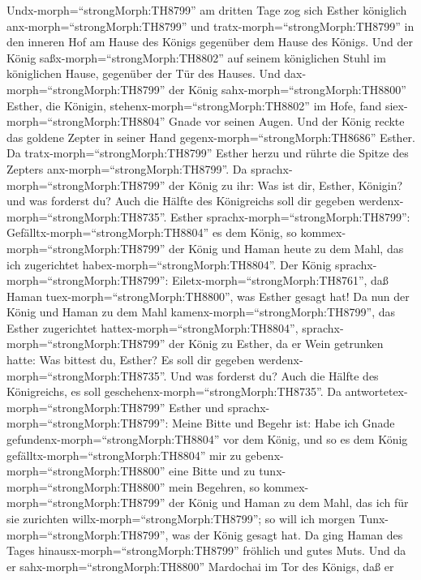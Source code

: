  Undx-morph=``strongMorph:TH8799'' am dritten Tage zog sich
Esther königlich anx-morph=``strongMorph:TH8799'' und
tratx-morph=``strongMorph:TH8799'' in den inneren Hof am Hause des
Königs gegenüber dem Hause des Königs. Und der König
saßx-morph=``strongMorph:TH8802'' auf seinem königlichen Stuhl im
königlichen Hause, gegenüber der Tür des Hauses.  Und
dax-morph=``strongMorph:TH8799'' der König
sahx-morph=``strongMorph:TH8800'' Esther, die Königin,
stehenx-morph=``strongMorph:TH8802'' im Hofe, fand
siex-morph=``strongMorph:TH8804'' Gnade vor seinen Augen. Und der König
reckte das goldene Zepter in seiner Hand
gegenx-morph=``strongMorph:TH8686'' Esther. Da
tratx-morph=``strongMorph:TH8799'' Esther herzu und rührte die Spitze
des Zepters anx-morph=``strongMorph:TH8799''.  Da
sprachx-morph=``strongMorph:TH8799'' der König zu ihr: Was ist dir,
Esther, Königin? und was forderst du? Auch die Hälfte des Königreichs
soll dir gegeben werdenx-morph=``strongMorph:TH8735''. 
Esther sprachx-morph=``strongMorph:TH8799'':
Gefälltx-morph=``strongMorph:TH8804'' es dem König, so
kommex-morph=``strongMorph:TH8799'' der König und Haman heute zu dem
Mahl, das ich zugerichtet habex-morph=``strongMorph:TH8804''.
 Der König sprachx-morph=``strongMorph:TH8799'':
Eiletx-morph=``strongMorph:TH8761'', daß Haman
tuex-morph=``strongMorph:TH8800'', was Esther gesagt hat! Da nun der
König und Haman zu dem Mahl kamenx-morph=``strongMorph:TH8799'', das
Esther zugerichtet hattex-morph=``strongMorph:TH8804'', 
sprachx-morph=``strongMorph:TH8799'' der König zu Esther, da er Wein
getrunken hatte: Was bittest du, Esther? Es soll dir gegeben
werdenx-morph=``strongMorph:TH8735''. Und was forderst du? Auch die
Hälfte des Königreichs, es soll geschehenx-morph=``strongMorph:TH8735''.
 Da antwortetex-morph=``strongMorph:TH8799'' Esther und
sprachx-morph=``strongMorph:TH8799'': Meine Bitte und Begehr ist:
 Habe ich Gnade gefundenx-morph=``strongMorph:TH8804'' vor
dem König, und so es dem König gefälltx-morph=``strongMorph:TH8804'' mir
zu gebenx-morph=``strongMorph:TH8800'' eine Bitte und zu
tunx-morph=``strongMorph:TH8800'' mein Begehren, so
kommex-morph=``strongMorph:TH8799'' der König und Haman zu dem Mahl, das
ich für sie zurichten willx-morph=``strongMorph:TH8799''; so will ich
morgen Tunx-morph=``strongMorph:TH8799'', was der König gesagt hat.
 Da ging Haman des Tages
hinausx-morph=``strongMorph:TH8799'' fröhlich und gutes Muts. Und da er
sahx-morph=``strongMorph:TH8800'' Mardochai im Tor des Königs, daß er
